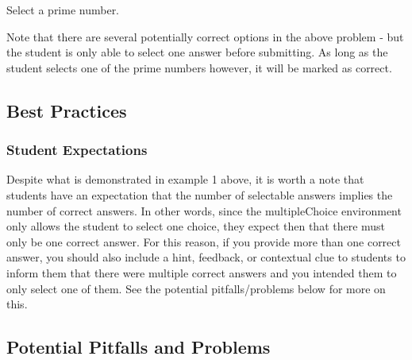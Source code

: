 \documentclass{ximera}
\begin{document}
            \begin{problem}
                Select a prime number.
                \begin{multipleChoice}
                \end{multipleChoice}
            \end{problem}
            
            Note that there are several potentially correct options in the above problem - but the student is only able to select one answer before submitting. As long as the student selects one of the prime numbers however, it will be marked as correct.
            
    \subsection*{Best Practices}
    
        \subsubsection*{Student Expectations}
            Despite what is demonstrated in example 1 above, it is worth a note that students have an expectation that the number of selectable answers implies the number of correct answers. In other words, since the multipleChoice environment only allows the student to select one choice, they expect then that there must only be one correct answer. For this reason, if you provide more than one correct answer, you should also include a hint, feedback, or contextual clue to students to inform them that there were multiple correct answers and you intended them to only select one of them. See the potential pitfalls/problems below for more on this.
            
        
        
    \subsection*{Potential Pitfalls and Problems}
        
\end{document}
